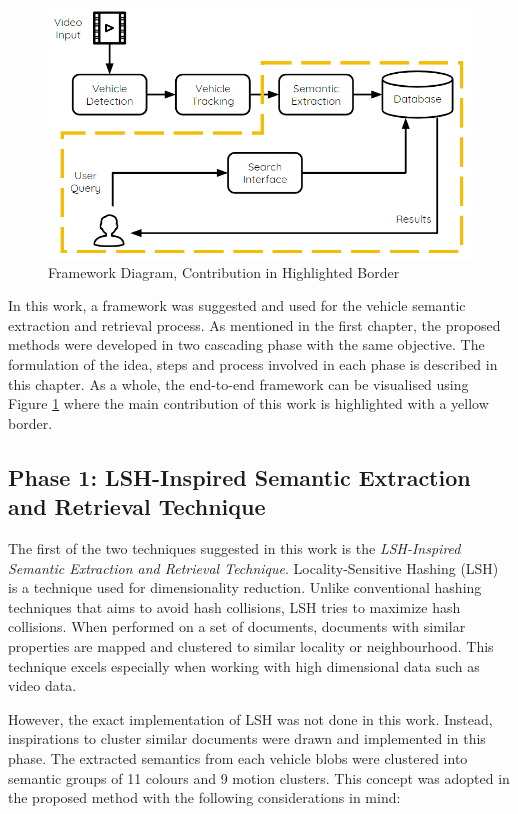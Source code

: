 \begin{figure}[hbt!]\centering
\includegraphics[width=.9\textwidth]{image/new/framework_new.PNG}
\caption{Framework Diagram, Contribution in Highlighted Border}
\label{fig:framework}
\end{figure}


In this work, a framework was suggested and used for the vehicle semantic extraction and retrieval process.
As mentioned in the first chapter, the proposed methods were developed in two cascading phase with the same objective.
The formulation of the idea, steps and process involved in each phase is described in this chapter.
As a whole, the end-to-end framework can be visualised using Figure \ref{fig:framework} where the main contribution of this work is highlighted with a yellow border.

\subsection{Phase 1: LSH-Inspired Semantic Extraction and Retrieval Technique}
\label{subsec:lsh-intro}
The first of the two techniques suggested in this work is the \textit{LSH-Inspired Semantic Extraction and Retrieval Technique}. Locality-Sensitive Hashing (LSH) is a technique used for dimensionality reduction.
Unlike conventional hashing techniques that aims to avoid hash collisions, LSH tries to maximize hash collisions.
When performed on a set of documents, documents with similar properties are mapped and clustered to similar locality or neighbourhood. This technique excels especially when working with high dimensional data such as video data.

However, the exact implementation of LSH was not done in this work. Instead, inspirations to cluster similar documents were drawn and implemented in this phase. The extracted semantics from each vehicle blobs were clustered into semantic groups of 11 colours and 9 motion clusters. This concept was adopted in the proposed method with the following considerations in mind:

